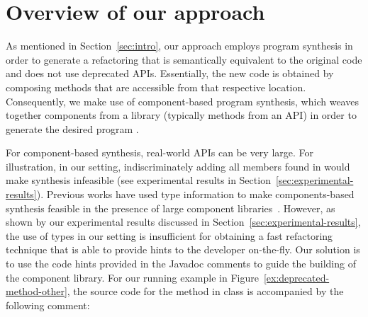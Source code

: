 \documentclass[runningheads,a4paper]{llncs}
\begin{document}
\section{Overview of our approach} \label{sec:overview}

As mentioned in Section~\ref{sec:intro}, our approach employs program synthesis
in order to generate a refactoring that is semantically equivalent to the original code and
does not use deprecated APIs.
Essentially, the new code is obtained by composing methods
that are accessible from that respective location. 
Consequently, we make use of component-based program synthesis,
which weaves together components from a library
(typically methods from an API) in order to generate the desired program \cite{DBLP:conf/icse/JhaGST10,DBLP:conf/pldi/GulwaniJTV11,DBLP:conf/popl/FengM0DR17}.

For component-based synthesis, real-world
APIs can be very large. %
For illustration, in our setting, indiscriminately adding all members
found in  would make synthesis infeasible (see experimental results in Section~\ref{sec:experimental-results}).
%
Previous works have used type information to make components-based synthesis
feasible in the presence of large component
libraries~\cite{DBLP:conf/popl/FengM0DR17}.  However, as shown by our
experimental results discussed in
Section~\ref{sec:experimental-results}, the use of types in our setting is insufficient
for obtaining a fast refactoring technique that is able to
provide hints to the developer on-the-fly.
%
%
Our solution is to use the code hints provided in the Javadoc comments to guide the building of the component library. For our running example in Figure~\ref{ex:deprecated-method-other}, the source code for the  method in class  is accompanied by the following comment: 
\end{document}
